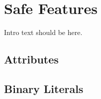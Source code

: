 
\chapter[Safe Features]{Safe Features}\label{ch-safe}

Intro text should be here. 

\renewcommand{\cppxx}{C++11}

\newpage
\section[Attributes\hspace*{1em}(Long Title)]{Attributes}\label{attributes}



\newpage
\section[Binary Literals\hspace*{1em}(Long Title)]{Binary Literals}\label{binary-literals}


\newpage

